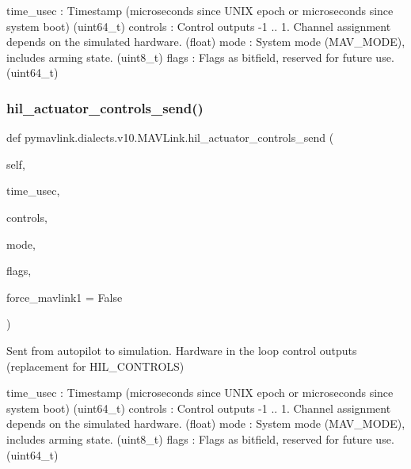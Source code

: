 \begin{DoxyVerb}
\begin{DoxyVerb}
\begin{DoxyVerb}
time_usec                 : Timestamp (microseconds since UNIX epoch or microseconds since system boot) (uint64_t)
controls                  : Control outputs -1 .. 1. Channel assignment depends on the simulated hardware. (float)
mode                      : System mode (MAV_MODE), includes arming state. (uint8_t)
flags                     : Flags as bitfield, reserved for future use. (uint64_t)\end{DoxyVerb}
 \mbox{\label{classpymavlink_1_1dialects_1_1v10_1_1MAVLink_af6832396b371d4808ef540bb2c424d1e}} 
\subsubsection{\texorpdfstring{hil\+\_\+actuator\+\_\+controls\+\_\+send()}{hil\_actuator\_controls\_send()}}
{\footnotesize\ttfamily def pymavlink.\+dialects.\+v10.\+M\+A\+V\+Link.\+hil\+\_\+actuator\+\_\+controls\+\_\+send (\begin{DoxyParamCaption}\item[{}]{self,  }\item[{}]{time\+\_\+usec,  }\item[{}]{controls,  }\item[{}]{mode,  }\item[{}]{flags,  }\item[{}]{force\+\_\+mavlink1 = {\ttfamily False} }\end{DoxyParamCaption})}

\begin{DoxyVerb}Sent from autopilot to simulation. Hardware in the loop control
outputs (replacement for HIL_CONTROLS)

time_usec                 : Timestamp (microseconds since UNIX epoch or microseconds since system boot) (uint64_t)
controls                  : Control outputs -1 .. 1. Channel assignment depends on the simulated hardware. (float)
mode                      : System mode (MAV_MODE), includes arming state. (uint8_t)
flags                     : Flags as bitfield, reserved for future use. (uint64_t)\end{DoxyVerb}
 \mbox{\label{classpymavlink_1_1dialects_1_1v10_1_1MAVLink_a2f475bf378f269fd0cc103b6b2ac4acc}} 

\end{DoxyVerb}
\end{DoxyVerb}
